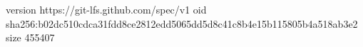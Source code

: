 version https://git-lfs.github.com/spec/v1
oid sha256:b02dc510cdca31fdd8ce2812edd5065dd5d8c41c8b4e15b115805b4a518ab3e2
size 455407
